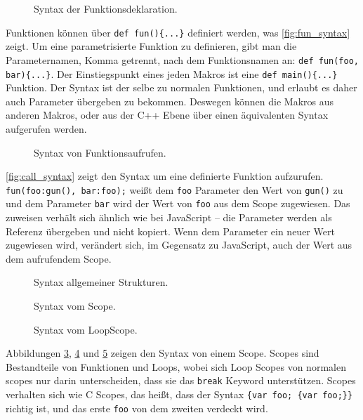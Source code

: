     \begin{figure}[H]
      \centering
      
      \caption{Syntax der Funktionsdeklaration.}
      \label{fig:fun_syntax}
    \end{figure}
    Funktionen können über \lstinline[style=MyMacroStyle]$def fun(){...}$ definiert werden, was \autoref{fig:fun_syntax} zeigt. Um eine parametrisierte Funktion zu definieren, gibt man die Parameternamen, Komma getrennt, nach dem Funktionsnamen an: \lstinline[style=MyMacroStyle]$def fun(foo, bar){...}$. Der Einstiegspunkt eines jeden Makros ist eine \lstinline[style=MyMacroStyle]$def main(){...}$ Funktion. Der Syntax ist der selbe zu normalen Funktionen, und erlaubt es daher auch Parameter übergeben zu bekommen. Deswegen können die Makros aus anderen Makros, oder aus der C++ Ebene über einen äquivalenten Syntax aufgerufen werden.

    \begin{figure}[H]
      \centering
      
      \caption{Syntax von Funktionsaufrufen.}
      \label{fig:call_syntax}
    \end{figure}
    \autoref{fig:call_syntax} zeigt den Syntax um eine definierte Funktion aufzurufen. \lstinline[style=MyMacroStyle]$fun(foo:gun(), bar:foo);$ weißt dem \lstinline[style=MyMacroStyle]$foo$ Parameter den Wert von \lstinline[style=MyMacroStyle]$gun()$ zu und dem Parameter \lstinline[style=MyMacroStyle]$bar$ wird der Wert von \lstinline[style=MyMacroStyle]$foo$ aus dem Scope zugewiesen. Das zuweisen verhält sich ähnlich wie bei JavaScript -- die Parameter werden als Referenz übergeben und nicht kopiert. Wenn dem Parameter ein neuer Wert zugewiesen wird, verändert sich, im Gegensatz zu JavaScript, auch der Wert aus dem aufrufendem Scope.

    \begin{figure}[H]
      \centering
      
      \caption{Syntax allgemeiner Strukturen.}
      \label{fig:common_syntax}
    \end{figure}

    \begin{figure}[H]
      \centering
      
      \caption{Syntax vom Scope.}
      \label{fig:scope_syntax}
    \end{figure}

    \begin{figure}[H]
      \centering
      
      \caption{Syntax vom LoopScope.}
      \label{fig:loop_scope_syntax}
    \end{figure}
    Abbildungen \ref{fig:common_syntax}, \ref{fig:scope_syntax} und \ref{fig:loop_scope_syntax} zeigen den Syntax von einem Scope. Scopes sind Bestandteile von Funktionen und Loops, wobei sich Loop Scopes von normalen scopes nur darin unterscheiden, dass sie das \lstinline[style=MyMacroStyle]$break$ Keyword unterstützen. Scopes verhalten sich wie C Scopes, das heißt, dass der Syntax \lstinline[style=MyMacroStyle]${var foo; {var foo;}}$ richtig ist, und das erste \lstinline[style=MyMacroStyle]$foo$ von dem zweiten verdeckt wird.

